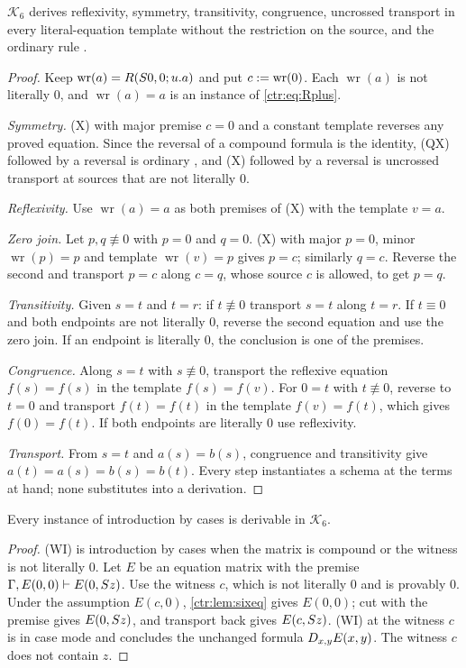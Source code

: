 \begin{lemma}\label{ctr:lem:sixeq}
$\mathcal K_6$ derives reflexivity, symmetry, transitivity, congruence, uncrossed transport
in every literal-equation template without the restriction on the source, and the ordinary
rule .
\end{lemma}
\begin{proof}
Keep $\operatorname{wr}(a)=R(S 0,0;u.a)$ and put $c\mathrel{:=}\operatorname{wr}(0)$. Each
$\operatorname{wr}(a)$ is not literally $0$, and $\operatorname{wr}(a)=a$ is an instance of
\eqref{ctr:eq:Rplus}.

\emph{Symmetry.} (X) with major premise $c=0$ and a constant template reverses any proved
equation. Since the reversal of a compound formula is the identity, (QX) followed by a
reversal is ordinary , and (X) followed by a reversal is uncrossed transport at
sources that are not literally $0$.

\emph{Reflexivity.} Use $\operatorname{wr}(a)=a$ as both premises of (X) with the template
$v=a$.

\emph{Zero join.} Let $p,q\not\equiv 0$ with $p=0$ and $q=0$. (X) with major $p=0$, minor
$\operatorname{wr}(p)=p$ and template $\operatorname{wr}(v)=p$ gives $p=c$; similarly
$q=c$. Reverse the second and transport $p=c$ along $c=q$, whose source $c$ is allowed, to
get $p=q$.

\emph{Transitivity.} Given $s=t$ and $t=r$: if $t\not\equiv 0$ transport $s=t$ along
$t=r$. If $t\equiv 0$ and both endpoints are not literally $0$, reverse the second equation
and use the zero join. If an endpoint is literally $0$, the conclusion is one of the
premises.

\emph{Congruence.} Along $s=t$ with $s\not\equiv 0$, transport the reflexive equation
$f(s)=f(s)$ in the template $f(s)=f(v)$. For $0=t$ with $t\not\equiv 0$, reverse to $t=0$
and transport $f(t)=f(t)$ in the template $f(v)=f(t)$, which gives $f(0)=f(t)$. If both
endpoints are literally $0$ use reflexivity.

\emph{Transport.} From $s=t$ and $a(s)=b(s)$, congruence and transitivity give
$a(t)=a(s)=b(s)=b(t)$. Every step instantiates a schema at the terms at hand; none
substitutes into a derivation.
\end{proof}

\begin{lemma}\label{ctr:lem:sixcase}
Every instance of introduction by cases is derivable in $\mathcal K_6$.
\end{lemma}
\begin{proof}
(WI) is introduction by cases when the matrix is compound or the witness is not literally
$0$. Let $E$ be an equation matrix with the premise $\Gamma,E(0,0)\vdash E(0,S z)$. Use
the witness $c$, which is not literally $0$ and is provably $0$. Under the assumption
$E(c,0)$, \cref{ctr:lem:sixeq} gives $E(0,0)$; cut with the premise gives $E(0,S z)$, and
transport back gives $E(c,S z)$. (WI) at the witness $c$ is in case mode and concludes
the unchanged formula $D_{x,y}E(x,y)$. The witness $c$ does not contain $z$.
\end{proof}

